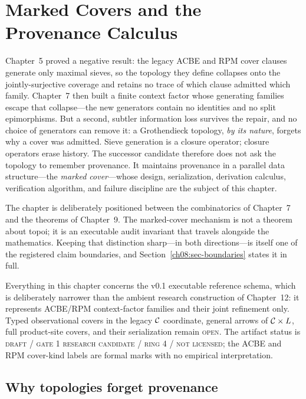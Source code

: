 \chapter{Marked Covers and the Provenance Calculus}\label{ch08:main}

Chapter~5 proved a negative result: the legacy ACBE and RPM cover clauses generate only maximal sieves, so the topology they define collapses onto the jointly-surjective coverage and retains no trace of which clause admitted which family. Chapter~7 then built a finite context factor whose generating families escape that collapse---the new generators contain no identities and no split epimorphisms. But a second, subtler information loss survives the repair, and no choice of generators can remove it: a Grothendieck topology, \emph{by its nature}, forgets why a cover was admitted. Sieve generation is a closure operator; closure operators erase history. The successor candidate therefore does not ask the topology to remember provenance. It maintains provenance in a parallel data structure---the \emph{marked cover}---whose design, serialization, derivation calculus, verification algorithm, and failure discipline are the subject of this chapter.

The chapter is deliberately positioned between the combinatorics of Chapter~7 and the theorems of Chapter~9. The marked-cover mechanism is not a theorem about topoi; it is an executable audit invariant that travels alongside the mathematics. Keeping that distinction sharp---in both directions---is itself one of the registered claim boundaries, and Section~\ref{ch08:sec-boundaries} states it in full.

\begin{boundary}\label{ch08:boundary-standing}
Everything in this chapter concerns the v0.1 executable reference schema, which is deliberately narrower than the ambient research construction of Chapter~12: it represents ACBE/RPM context-factor families and their joint refinement only. Typed observational covers in the legacy $\mathcal{C}$ coordinate, general arrows of $\mathcal{C}\times L$, full product-site covers, and their serialization remain \textsc{open}. The artifact status is \textsc{draft / gate 1 research candidate / ring 4 / not licensed}; the ACBE and RPM cover-kind labels are formal marks with no empirical interpretation.
\end{boundary}

\section{Why topologies forget provenance}\label{ch08:sec-forget}

